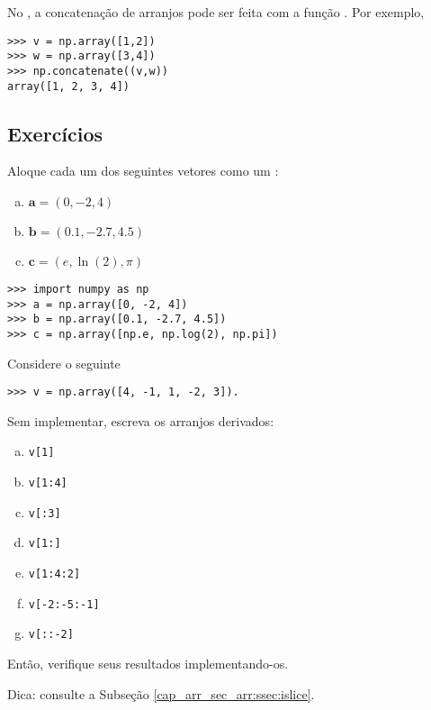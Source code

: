 \begin{obs}
  No {\numpy}, a concatenação de arranjos pode ser feita com a função {\PYTHONnumpyDOTconcatenate}. Por exemplo,

\begin{lstlisting}
>>> v = np.array([1,2])
>>> w = np.array([3,4])
>>> np.concatenate((v,w))
array([1, 2, 3, 4])
\end{lstlisting}

\end{obs}

\subsection{Exercícios}

\begin{exer}
  Aloque cada um dos seguintes vetores como um {\PYTHONnumpyDOTarray}:
  \begin{enumerate}[a)]
  \item $\displaystyle\pmb{a} = (0, -2, 4)$
  \item $\displaystyle\pmb{b} = (0.1, -2.7, 4.5)$
  \item $\displaystyle\pmb{c} = (e, \ln(2), \pi)$
  \end{enumerate}
\end{exer}
\begin{resp}

\begin{lstlisting}
>>> import numpy as np
>>> a = np.array([0, -2, 4])
>>> b = np.array([0.1, -2.7, 4.5])
>>> c = np.array([np.e, np.log(2), np.pi])
\end{lstlisting}

\end{resp}

\begin{exer}
  Considere o seguinte {\PYTHONnumpyDOTarray}

\begin{lstlisting}
>>> v = np.array([4, -1, 1, -2, 3]).
\end{lstlisting}

Sem implementar, escreva os arranjos derivados:
  \begin{enumerate}[a)]
  \item \lstinline+v[1]+
  \item \lstinline+v[1:4]+
  \item \lstinline+v[:3]+
  \item \lstinline+v[1:]+
  \item \lstinline+v[1:4:2]+
  \item \lstinline+v[-2:-5:-1]+
  \item \lstinline+v[::-2]+
  \end{enumerate}
  Então, verifique seus resultados implementando-os.
\end{exer}
\begin{resp}
  Dica: consulte a Subseção \ref{cap_arr_sec_arr:ssec:islice}. 
\end{resp}

